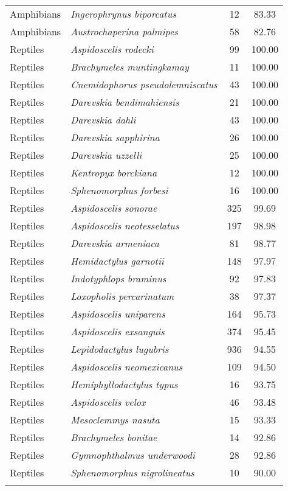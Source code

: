 \begin{longtable}{l>{\itshape}lcc}
  Amphibians & Ingerophrynus biporcatus &  12 & 83.33 \\ 
  Amphibians & Austrochaperina palmipes &  58 & 82.76 \\ 
  Reptiles & Aspidoscelis rodecki &  99 & 100.00 \\ 
  Reptiles & Brachymeles muntingkamay &  11 & 100.00 \\ 
  Reptiles & Cnemidophorus pseudolemniscatus &  43 & 100.00 \\ 
  Reptiles & Darevskia bendimahiensis &  21 & 100.00 \\ 
  Reptiles & Darevskia dahli &  43 & 100.00 \\ 
  Reptiles & Darevskia sapphirina &  26 & 100.00 \\ 
  Reptiles & Darevskia uzzelli &  25 & 100.00 \\ 
  Reptiles & Kentropyx borckiana &  12 & 100.00 \\ 
  Reptiles & Sphenomorphus forbesi &  16 & 100.00 \\ 
  Reptiles & Aspidoscelis sonorae & 325 & 99.69 \\ 
  Reptiles & Aspidoscelis neotesselatus & 197 & 98.98 \\ 
  Reptiles & Darevskia armeniaca &  81 & 98.77 \\ 
  Reptiles & Hemidactylus garnotii & 148 & 97.97 \\ 
  Reptiles & Indotyphlops braminus &  92 & 97.83 \\ 
  Reptiles & Loxopholis percarinatum &  38 & 97.37 \\ 
  Reptiles & Aspidoscelis uniparens & 164 & 95.73 \\ 
  Reptiles & Aspidoscelis exsanguis & 374 & 95.45 \\ 
  Reptiles & Lepidodactylus lugubris & 936 & 94.55 \\ 
  Reptiles & Aspidoscelis neomexicanus & 109 & 94.50 \\ 
  Reptiles & Hemiphyllodactylus typus &  16 & 93.75 \\ 
  Reptiles & Aspidoscelis velox &  46 & 93.48 \\ 
  Reptiles & Mesoclemmys nasuta &  15 & 93.33 \\ 
  Reptiles & Brachymeles bonitae &  14 & 92.86 \\ 
  Reptiles & Gymnophthalmus underwoodi &  28 & 92.86 \\ 
  Reptiles & Sphenomorphus nigrolineatus &  10 & 90.00 \\ 
   \hline
\hline
\label{table_worst}
\end{longtable}
